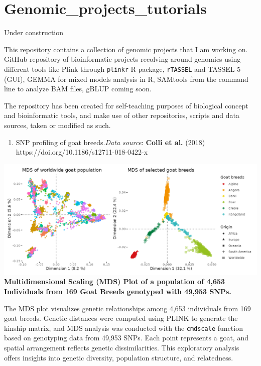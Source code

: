 \hypertarget{genomic_projects_tutorials}{%
  \section{Genomic\_projects\_tutorials}\label{genomic_projects_tutorials}}

Under construction

This repository contains a collection of genomic projects that I am
working on. GitHub repository of bioinformatic projects recolving around
genomics using different tools like Plink through \texttt{plinkr} R
package, \texttt{rTASSEL} and TASSEL 5 (GUI), GEMMA for mixed models
analysis in R, SAMtools from the command line to analyze BAM files,
gBLUP coming soon.

The repository has been created for self-teaching purposes of biological
concept and bioinformatic tools, and make use of other repositories,
scripts and data sources, taken or modified as such.

\begin{enumerate}
  \def\labelenumi{\arabic{enumi}.}
  \tightlist
  \item
        SNP profiling of goat breeds.\emph{Data source}: \textbf{Colli et al.}
        (2018) https://doi.org/10.1186/s12711-018-0422-x
\end{enumerate}

\includegraphics{Figures/goat_mds_2.png?raw=true}
\textbf{Multidimensional Scaling (MDS) Plot of a population of 4,653
  Individuals from 169 Goat Breeds genotyped with 49,953 SNPs.}

The MDS plot visualizes genetic relationships among 4,653 individuals
from 169 goat breeds. Genetic distances were computed using PLINK to
generate the kinship matrix, and MDS analysis was conducted with the
\texttt{cmdscale} function based on genotyping data from 49,953 SNPs.
Each point represents a goat, and spatial arrangement reflects genetic
dissimilarities. This exploratory analysis offers insights into genetic
diversity, population structure, and relatedness.

